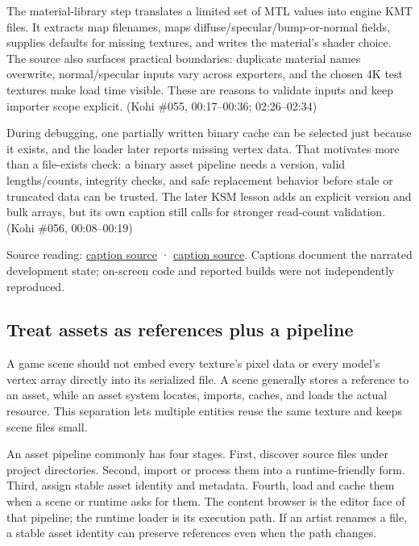 The material-library step translates a limited set of MTL values into engine KMT files. It extracts map filenames, maps diffuse/specular/bump-or-normal fields, supplies defaults for missing textures, and writes the material's shader choice. The source also surfaces practical boundaries: duplicate material names overwrite, normal/specular inputs vary across exporters, and the chosen 4K test textures make load time visible. These are reasons to validate inputs and keep importer scope explicit. (Kohi \#055, 00:17--00:36; 02:26--02:34)

During debugging, one partially written binary cache can be selected just because it exists, and the loader later reports missing vertex data. That motivates more than a file-exists check: a binary asset pipeline needs a version, valid lengths/counts, integrity checks, and safe replacement behavior before stale or truncated data can be trusted. The later KSM lesson adds an explicit version and bulk arrays, but its own caption still calls for stronger read-count validation. (Kohi \#056, 00:08--00:19)

Source reading: \href{https://www.youtube.com/watch?v=kIbW4Kv6p4c}{caption source} · \href{https://www.youtube.com/watch?v=Uk2p3vKBMXE}{caption source}. Captions document the narrated development state; on-screen code and reported builds were not independently reproduced.

\subsection{Treat assets as references plus a pipeline}\label{06-engine-ii-ch027-treat-assets-as-references-plus-a-pipeline}

A game scene should not embed every texture's pixel data or every model's vertex array directly into its serialized file. A scene generally stores a reference to an asset, while an asset system locates, imports, caches, and loads the actual resource. This separation lets multiple entities reuse the same texture and keeps scene files small.

An asset pipeline commonly has four stages. First, discover source files under project directories. Second, import or process them into a runtime-friendly form. Third, assign stable asset identity and metadata. Fourth, load and cache them when a scene or runtime asks for them. The content browser is the editor face of that pipeline; the runtime loader is its execution path. If an artist renames a file, a stable asset identity can preserve references even when the path changes.

